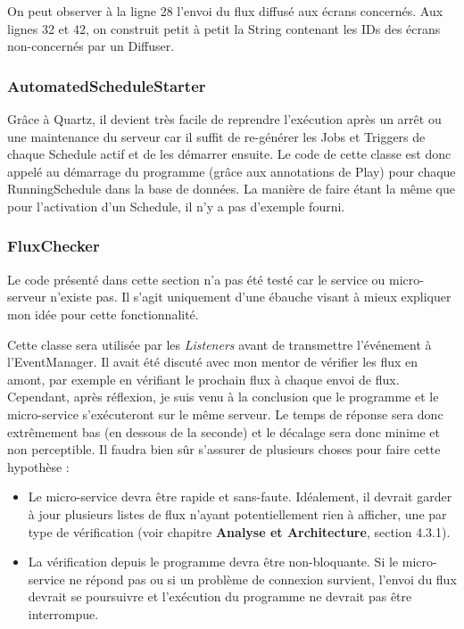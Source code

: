 \documentclass[french]{article}
\begin{document}


On peut observer à la ligne 28 l'envoi du flux diffusé aux écrans concernés. Aux lignes 32 et 42, on construit petit à petit la String contenant les IDs des écrans non-concernés par un Diffuser. 

\newpage
\subsubsection{AutomatedScheduleStarter}

Grâce à Quartz, il devient très facile de reprendre l'exécution après un arrêt ou une maintenance du serveur car il suffit de re-générer les Jobs et Triggers de chaque Schedule actif et de les démarrer ensuite. Le code de cette classe est donc appelé au démarrage du programme (grâce aux annotations de Play) pour chaque RunningSchedule dans la base de données. La manière de faire étant la même que pour l'activation d'un Schedule, il n'y a pas d'exemple fourni.

\subsubsection{FluxChecker}

Le code présenté dans cette section n'a pas été testé car le service ou micro-serveur n'existe pas. Il s'agit uniquement d'une ébauche visant à mieux expliquer mon idée pour cette fonctionnalité.



Cette classe sera utilisée par les \textit{Listeners} avant de transmettre l'événement à l'EventManager. Il avait été discuté avec mon mentor de vérifier les flux en amont, par exemple en vérifiant le prochain flux à chaque envoi de flux. Cependant, après réflexion, je suis venu à la conclusion que le programme et le micro-service s'exécuteront sur le même serveur. Le temps de réponse sera donc extrêmement bas (en dessous de la seconde) et le décalage sera donc minime et non perceptible. Il faudra bien sûr s'assurer de plusieurs choses pour faire cette hypothèse :
\begin{itemize}
	\item Le micro-service devra être rapide et sans-faute. Idéalement, il devrait garder à jour plusieurs listes de flux n'ayant potentiellement rien à afficher, une par type de vérification (voir chapitre \textbf{Analyse et Architecture}, section 4.3.1).
	\item La vérification depuis le programme devra être non-bloquante. Si le micro-service ne répond pas ou si un problème de connexion survient, l'envoi du flux devrait se poursuivre et l'exécution du programme ne devrait pas être interrompue.
\end{itemize}
 
\end{document}
